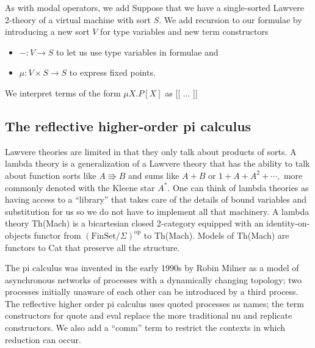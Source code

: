 \documentclass{article}
\newcommand{\maps}{\colon}
\newcommand{\FinSet}{\mathrm{FinSet}}
\newcommand{\op}{\mathrm{op}}
\begin{document}
As with modal operators, we add Suppose that we have a single-sorted Lawvere 2-theory of a virtual machine with sort $S$.  We add recursion to our formulae by introducing a new sort $V$ for type variables and new term constructors 
\begin{itemize}
  \item $- \maps V \to S$ to let us use type variables in formulae and
  \item $\mu\maps V\times S \to S$ to express fixed points.
\end{itemize}

We interpret terms of the form $\mu X.P[X]$ as [[ ... ]]

\subsection{The reflective higher-order pi calculus}

Lawvere theories are limited in that they only talk about products of sorts.  A lambda theory is a generalization of a Lawvere theory that has the ability to talk about function sorts like $A \Rrightarrow B$ and sums like $A+B$ or $1 + A + A^2 + \cdots,$ more commonly denoted with the Kleene star $A^*.$  One can think of lambda theories as having access to a ``library'' that takes care of the details of bound variables and substitution for us so we do not have to implement all that machinery.  A lambda theory Th(Mach) is a bicartesian closed 2-category equipped with an identity-on-objects functor from $(\FinSet/\Sigma)^{\op}$ to Th(Mach).  Models of Th(Mach) are functors to Cat that preserve all the structure.

The pi calculus was invented in the early 1990s by Robin Milner as a model of asynchronous networks of processes with a dynamically changing topology; two processes initially unaware of each other can be introduced by a third process.  The reflective higher order pi calculus uses quoted processes as names; the term constructors for quote and eval replace the more traditional nu and replicate constructors.  We also add a ``comm'' term to restrict the contexts in which reduction can occur.
\end{document}
